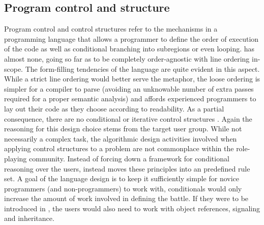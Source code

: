 \subsection{Program control and structure}
Program control and control structures refer to the mechanisms in a programming language that allows a programmer to define the order of execution of the code as well as conditional branching into subregions or even looping. \langname{} has almost none, going so far as to be completely order-agnostic with line ordering in-scope. 
The form-filling tendencies of the language are quite evident in this aspect. While a strict line ordering would better serve the metaphor, the loose ordering is simpler for a compiler to parse  (avoiding an unknowable number of extra passes required for a proper semantic analysis) and affords experienced programmers to lay out their code as they choose according to readability. As a partial consequence, there are no conditional or iterative control structures .
Again the reasoning for this design choice stems from the target user group. While not necessarily a complex task, the algorithmic design activities involved when applying control structures to a problem are not commonplace within the role-playing community. Instead of forcing down a framework for conditional reasoning over the users, \langname{} instead moves these principles into an predefined rule set.
A goal of the language design is to keep it sufficiently simple for novice programmers (and non-programmers) to work with, conditionals would only increase the amount of work involved in defining the battle. If they were to be introduced in \langname{}, the users would also need to work with object references, signaling and inheritance.
